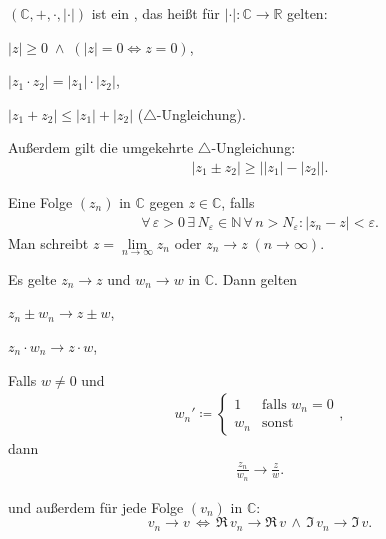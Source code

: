 \begin{theorem}[Satz]
  $(\mathbb{C},+,\cdot,|\cdot|)$ ist ein , das heißt für $|\cdot| : \mathbb{C} \to \mathbb{R}$ gelten:
  \begin{enum-arab}
    \item $|z| \geq 0 \; \land \; (|z| = 0 \iff z = 0)$,
    
    \item $|z_1 \cdot z_2| = |z_1| \cdot |z_2|$,
    
    \item $|z_1 + z_2| \leq |z_1| + |z_2|$ ($\triangle$-Ungleichung).
    
    Außerdem gilt die umgekehrte $\triangle$-Ungleichung:
    \begin{align*}
      |z_1 \pm z_2| \geq \Big| |z_1| - |z_2| \Big|.
    \end{align*}
  \end{enum-arab}
\end{theorem}

\begin{theorem}[Definition]
  Eine Folge $(z_n)$ in $\mathbb{C}$  gegen $z \in \mathbb{C}$, falls
  \begin{align*}
    \forall \, \varepsilon > 0 \, \exists \, N_\varepsilon \in \mathbb{N} \, \forall \, n > N_\varepsilon : |z_n - z| < \varepsilon.
  \end{align*}
  Man schreibt $z = \lim\limits_{n \to \infty} z_n$ oder $z_n \to z \; (n \to \infty)$.
\end{theorem}

\begin{theorem}[Satz] \label{thm:1.6}
  Es gelte $z_n \to z$ und $w_n \to w$ in $\mathbb{C}$. Dann gelten
  \begin{enum-arab}
    \item $z_n \pm w_n \to z \pm w$,
    
    \item $z_n \cdot w_n \to z \cdot w$,
    
    \item Falls $w \neq 0$ und
    \begin{align*}
      w_n' \coloneq
      \begin{cases}
        1 & \text{falls } w_n = 0 \\
        w_n & \text{sonst}
      \end{cases},
    \end{align*}
    dann
    \begin{align*}
      \frac{z_n}{w_n} \to \frac{z}{w}.
    \end{align*}
    
    \item und außerdem für jede Folge $(v_n)$ in $\mathbb{C}$:
      \[
        v_n \to v \, \iff \, \Re\, v_n \to \Re\, v \, \land \, \Im\, v_n \to \Im\, v.
      \]
  \end{enum-arab}
\end{theorem}

